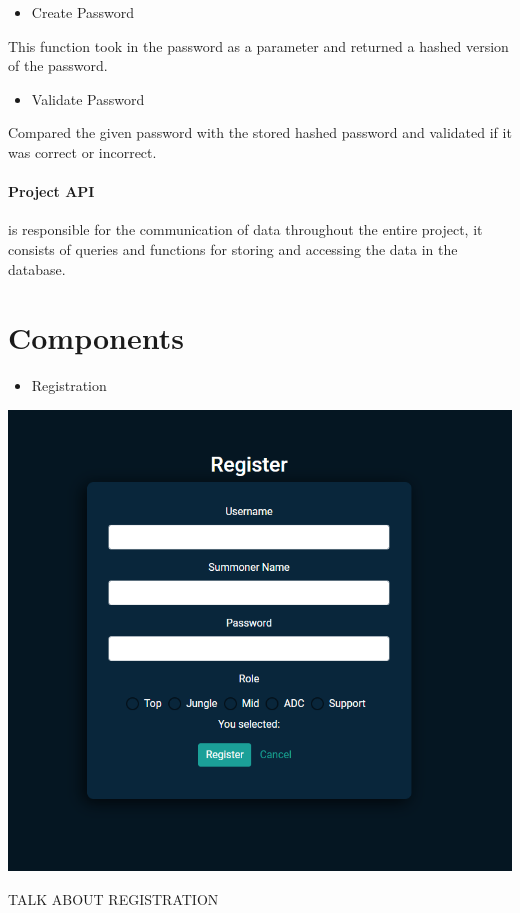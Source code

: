 \begin{itemize}
	\item Create Password
\end{itemize}
This function took in the password as a parameter and returned a hashed version of the password.

\begin{itemize}
	\item Validate Password
\end{itemize}
Compared the given password with the stored hashed password and validated if it was correct or incorrect.


\paragraph{Project API} is responsible for the communication of data throughout the entire project, it consists of queries and functions for storing and accessing the data in the database.

\newpage
\section{Components}
\begin{itemize}
	\item Registration
\end{itemize}
\begin{center}    
	\includegraphics[width=\textwidth/2,height=\textheight,keepaspectratio]{img/Register.png}
\end{center}
TALK ABOUT REGISTRATION

